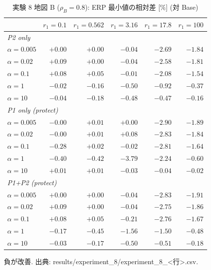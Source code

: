 \begin{table}[tbp]
\centering
\caption{実験 8 地図 B ($\rho_B=0.8$): ERP 最小値の相対差 [\%] (対 Base)}
\label{tab:exp8-mapb}
\small
\begin{tabular}{lrrrrr}
\toprule
 & $r_1=0.1$ & $r_1=0.562$ & $r_1=3.16$ & $r_1=17.8$ & $r_1=100$ \\
\midrule
\multicolumn{6}{l}{\textit{P2 only}} \\
$\alpha=0.005$ & $+0.00$ & $+0.00$ & $-0.04$ & $-2.69$ & $-1.84$ \\
$\alpha=0.02$ & $+0.09$ & $+0.00$ & $-0.04$ & $-2.58$ & $-1.81$ \\
$\alpha=0.1$ & $+0.08$ & $+0.05$ & $-0.01$ & $-2.08$ & $-1.54$ \\
$\alpha=1$ & $-0.02$ & $-0.16$ & $-0.50$ & $-0.92$ & $-0.37$ \\
$\alpha=10$ & $-0.04$ & $-0.18$ & $-0.48$ & $-0.47$ & $-0.16$ \\
\multicolumn{6}{l}{\textit{P1 only (protect)}} \\
$\alpha=0.005$ & $-0.00$ & $+0.01$ & $+0.00$ & $-2.90$ & $-1.89$ \\
$\alpha=0.02$ & $-0.00$ & $+0.01$ & $+0.08$ & $-2.83$ & $-1.84$ \\
$\alpha=0.1$ & $-0.28$ & $+0.02$ & $-0.02$ & $-2.81$ & $-1.64$ \\
$\alpha=1$ & $-0.40$ & $-0.42$ & $-3.79$ & $-2.24$ & $-0.60$ \\
$\alpha=10$ & $+0.01$ & $+0.01$ & $-0.03$ & $-0.04$ & $-0.02$ \\
\multicolumn{6}{l}{\textit{P1+P2 (protect)}} \\
$\alpha=0.005$ & $+0.00$ & $+0.00$ & $-0.04$ & $-2.83$ & $-1.91$ \\
$\alpha=0.02$ & $+0.09$ & $+0.00$ & $-0.04$ & $-2.75$ & $-1.86$ \\
$\alpha=0.1$ & $+0.08$ & $+0.05$ & $-0.21$ & $-2.76$ & $-1.67$ \\
$\alpha=1$ & $-0.17$ & $-0.45$ & $-1.56$ & $-1.50$ & $-0.48$ \\
$\alpha=10$ & $-0.03$ & $-0.17$ & $-0.50$ & $-0.51$ & $-0.18$ \\
\bottomrule
\end{tabular}
\par\smallskip
\footnotesize 負が改善. 出典: results/experiment\_8/experiment\_8\_<行>.csv.
\end{table}
